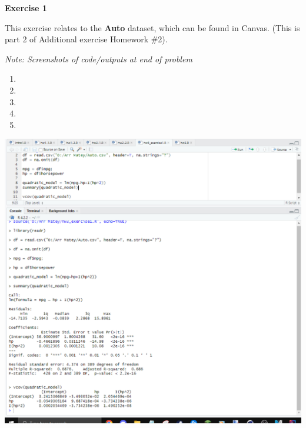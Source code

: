 \textbf{Exercise 1}

\nl This exercise relates to the \textbf{Auto} dataset, which can be found in Canvas. (This is part 2 of Additional exercise Homework \#2).

\textit{Note: Screenshots of code/outputs at end of problem}
\begin{enumerate}
\item 
\item 
\item 
\item 
\item 
\end{enumerate}

\begin{center}
    \includegraphics[width=6in]{img/ex1.PNG}
\end{center}